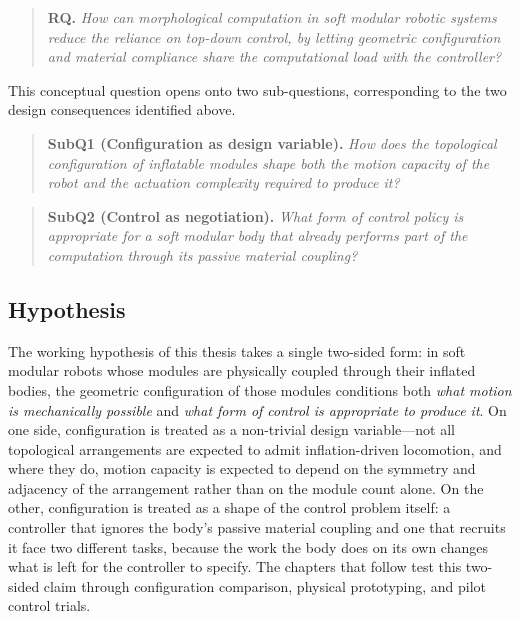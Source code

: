\begin{quote}
\textbf{RQ.} \textit{How can morphological computation in soft modular robotic systems reduce the reliance on top-down control, by letting geometric configuration and material compliance share the computational load with the controller?}
\end{quote}

This conceptual question opens onto two sub-questions, corresponding to the two design consequences identified above.

\begin{quote}
\textbf{SubQ1 (Configuration as design variable).} \textit{How does the topological configuration of inflatable modules shape both the motion capacity of the robot and the actuation complexity required to produce it?}
\end{quote}

\begin{quote}
\textbf{SubQ2 (Control as negotiation).} \textit{What form of control policy is appropriate for a soft modular body that already performs part of the computation through its passive material coupling?}
\end{quote}

\subsection{Hypothesis}

The working hypothesis of this thesis takes a single two-sided form: in soft modular robots whose modules are physically coupled through their inflated bodies, the geometric configuration of those modules conditions both \textit{what motion is mechanically possible} and \textit{what form of control is appropriate to produce it}. On one side, configuration is treated as a non-trivial design variable---not all topological arrangements are expected to admit inflation-driven locomotion, and where they do, motion capacity is expected to depend on the symmetry and adjacency of the arrangement rather than on the module count alone. On the other, configuration is treated as a shape of the control problem itself: a controller that ignores the body's passive material coupling and one that recruits it face two different tasks, because the work the body does on its own changes what is left for the controller to specify. The chapters that follow test this two-sided claim through configuration comparison, physical prototyping, and pilot control trials.
